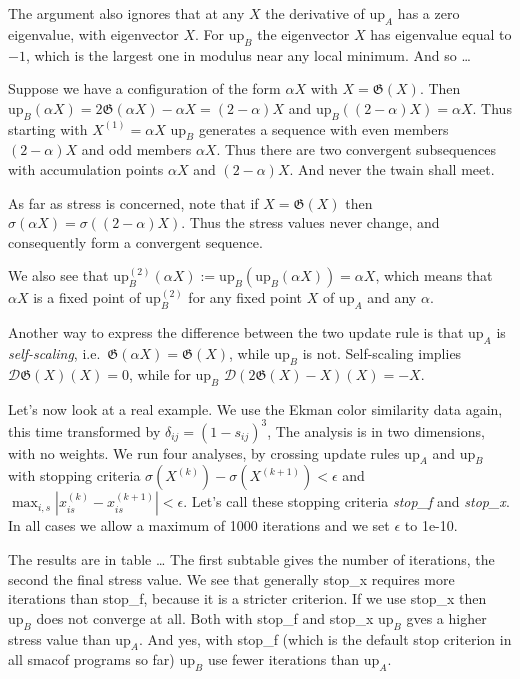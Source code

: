 \documentclass[
  12pt,
]{book}
\theoremstyle{definition}
\theoremstyle{definition}
\theoremstyle{definition}
\theoremstyle{definition}
\theoremstyle{remark}
\begin{document}
The argument also ignores that at any \(X\) the derivative of \(\text{up}_A\) has a zero eigenvalue, with eigenvector \(X\). For \(\text{up}_B\) the eigenvector \(X\) has eigenvalue equal to \(-1\), which is the largest one in modulus near any local minimum. And so \ldots{}

Suppose we have a configuration of the form \(\alpha X\) with \(X=\mathfrak{G}(X)\).
Then \(\text{up}_B(\alpha X)=2\mathfrak{G}(\alpha X)-\alpha X=(2-\alpha)X\) and
\(\text{up}_B((2-\alpha)X)=\alpha X\). Thus starting with \(X^{(1)}=\alpha X\)
\(\text{up}_B\) generates a sequence with even members \((2-\alpha)X\) and odd members
\(\alpha X\). Thus there are two convergent subsequences with accumulation points
\(\alpha X\) and \((2-\alpha)X\). And never the twain shall meet.

As far as stress is concerned, note that if \(X=\mathfrak{G}(X)\) then \(\sigma(\alpha X)=\sigma((2-\alpha)X)\). Thus the stress values never change, and consequently form a convergent sequence.

We also see that \(\text{up}^{(2)}_B(\alpha X):=\text{up}_B(\text{up}_B(\alpha X))=\alpha X\), which means that \(\alpha X\) is a fixed point of \(\text{up}_B^{(2)}\) for any fixed point \(X\) of \(\text{up}_A\) and any \(\alpha\).

Another way to express the difference between the two update rule is that \(\text{up}_A\)
is \emph{self-scaling}, i.e.~\(\mathfrak{G}(\alpha X)=\mathfrak{G}(X)\), while \(\text{up}_B\)
is not. Self-scaling implies \(\mathcal{D}\mathfrak{G}(X)(X)=0\), while for \(\text{up}_B\)
\(\mathcal{D}(2\mathfrak{G}(X)-X)(X)=-X\).

Let's now look at a real example. We use the Ekman color similarity data again, this time transformed by \(\delta_{ij}=(1-s_{ij})^3\), The analysis is in two dimensions, with no weights. We run four analyses, by crossing update rules \(\text{up}_A\) and \(\text{up}_B\) with stopping criteria \(\sigma(X^{(k)})-\sigma(X^{(k+1)})<\epsilon\) and \(\max_{i,s}|x^{(k)}_{is}-x^{(k+1)}_{is}|<\epsilon\). Let's call these stopping criteria \emph{stop\_f} and \emph{stop\_x}. In all cases we allow a maximum of 1000 iterations and we set \(\epsilon\) to 1e-10.

The results are in table \ldots{} The first subtable gives the number of iterations, the second the final stress value.
We see that generally stop\_x requires more iterations than stop\_f, because it is a stricter criterion. If we use
stop\_x then \(\text{up}_B\) does not converge at all. Both with stop\_f and stop\_x \(\text{up}_B\) gves a higher stress value than \(\text{up}_A\). And yes, with stop\_f (which is the default stop criterion in all smacof programs so far)
\(\text{up}_B\) use fewer iterations than \(\text{up}_A\).
\end{document}
